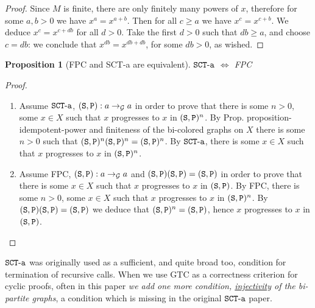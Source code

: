 \documentclass{lmcs}
\newtheorem{proposition}[theorem]{Proposition}
\begin{document}
\begin{proof}
Since $M$ is finite, there are only finitely many powers of $x$, therefore 
for some $a,b>0$ we have $x^a = x^{a+b}$. Then for all $c \ge a$ we have $x^c = x^{c+b}$.
We deduce $x^c = x^{c+db}$ for all $d>0$. Take the first $d>0$ such that $db \ge a$,
and choose $c=db$: we conclude that 
$x^{db} = x^{db+db}$, for some $db >0$, as wished.
\end{proof}

\begin{proposition}[FPC and SCT-a are equivalent]
\label{proposition-SCT}
$\SCTa$ $\Leftrightarrow$ FPC
\end{proposition}

\begin{proof}
\begin{enumerate}
\item
Assume $\SCTa$, $\composable{\setG}{a}{a}{(\Stat,\Prog)}$ in order to prove that 
there is some $n > 0 $, some $x \in X$ such that $x$ progresses to $x$ in $(\Stat,\Prog)^n$.
By Prop. {proposition-idempotent-power} and finiteness of the bi-colored graphs on $X$
there is some $n > 0$ such that $(\Stat,\Prog)^n(\Stat,\Prog)^n=(\Stat,\Prog)^n$. By $\SCTa$,
there is some $x \in X$ such that $x$ progresses to $x$ in $(\Stat,\Prog)^n$.
\item
Assume FPC, $\composable{\setG}{a}{a}{(\Stat,\Prog)}$ and 
$(\Stat,\Prog)(\Stat,\Prog)=(\Stat,\Prog)$ in order to prove that 
there is some $x \in X$ such that $x$ progresses to $x$ in $(\Stat,\Prog)$.
By FPC, there is some $n > 0 $, some $x \in X$ such that $x$ progresses to $x$ in 
$(\Stat,\Prog)^n$. By $(\Stat,\Prog)(\Stat,\Prog)=(\Stat,\Prog)$ we deduce that 
$(\Stat,\Prog)^n=(\Stat,\Prog)$, hence $x$ progresses to $x$ in $(\Stat,\Prog)$.
\end{enumerate}
\end{proof}

$\SCTa$ was originally used as a sufficient, and quite broad too, 
condition for termination of recursive calls. 
When we use GTC as a correctness criterion for cyclic proofs, often in this paper 
\emph{we add one more condition, \underline{injectivity} of the bi-partite graphs}, 
a condition which is missing in the original $\SCTa$ paper. 

%
%
\end{document}
